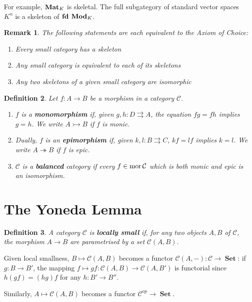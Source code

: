 \documentclass[a4paper]{article}
\newtheorem{definition}{Definition}
\newtheorem{remark}[definition]{Remark}
\numberwithin{definition}{section}
\newcommand*\mor[1]{\textnormal{mor}\,#1}
\DeclareMathOperator{\Set}{\textbf{Set}}
\begin{document}
For example, $\text{\textbf{Mat}}_K$ is skeletal. The full subgategory of standard vector spaces $K^n$ is a skeleton of $\text{\textbf{fd Mod}}_K$.

\begin{remark}
	The following statements are each equivalent to the Axiom of Choice:
	\begin{enumerate}
		\item Every small category has a skeleton
		\item Any small category is equivalent to each of its skeletons
		\item Any two skeletons of a given small category are isomorphic
	\end{enumerate}
\end{remark}

\begin{definition}
	Let $f: A \to B$ be a morphism in a category $\mathcal{C}$.
	\begin{enumerate}[label=\alph*.]
		\item $f$ is a \textbf{monomorphism} if, given $g,h:D \rightrightarrows A$, the equation $fg = fh$ implies $g=h$. We write $A \rightarrowtail B$ if $f$ is monic.
		\item Dually, $f$ is an \textbf{epimorphism} if, given $k,l: B \rightrightarrows C$, $kf = lf$ implies $k=l$. We write $A \twoheadrightarrow B$ if $f$ is epic.
		\item $\mathcal{C}$ is a \textbf{balanced} category if every $f \in \mor \mathcal{C}$ which is both monic and epic is an isomorphism.
	\end{enumerate}
\end{definition}

\section{The Yoneda Lemma}
\begin{definition}
	A category $\mathcal{C}$ is \textbf{locally small} if, for any two objects $A, B$ of $\mathcal{C}$, the morphism $A \to B$ are parametrised by a set $\mathcal{C}(A, B)$.
\end{definition}

Given local smallness, $B \mapsto \mathcal{C}(A,B)$ becomes a functor $\mathcal{C}(A, -): \mathcal{C} \to \Set$: if $g: B \to B'$, the mapping $f \mapsto gf : \mathcal{C}(A, B) \to \mathcal{C}(A, B')$ is functorial since $h(gf) = (hg)f$ for any $h: B' \to B''$.

Similarly, $A \mapsto \mathcal{C}(A, B)$ becomes a functor $\mathcal{C}^{op} \to \Set$.
\end{document}
